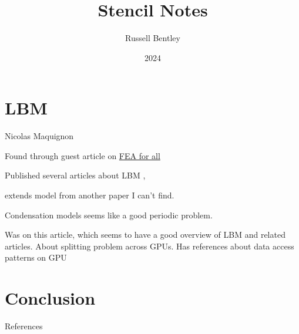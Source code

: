 \documentclass{beamer}
\title{Stencil Notes}
\author{Russell Bentley}
\institute{Stony Brook}
\date{2024}
\begin{document}
\frame{\titlepage}

\section{LBM}
\begin{frame}{Nicolas Maquignon}
  \begin{outline}
    \1 Found through guest article on 
    \href{https://feaforall.com/implementation-lattice-boltzmann-method-lbm/}{FEA for all}

    \1 Published several articles about LBM \cite{Maquignon2014}, \cite{Maquignon2022}

    \2 \cite{Maquignon2014} extends model from another paper I can't find.
      
    \2 Condensation models seems like a good periodic problem.

    \1 Was on this article, which seems to have a good overview of LBM and related articles. 
    About splitting problem across GPUs.
    Has references about data access patterns on GPU
    \cite{Duchateau2015}
  \end{outline}
\end{frame}

\section{Conclusion}
\begin{frame}[allowframebreaks]{References}
    \tiny
    \printbibliography
\end{frame}
\end{document}
